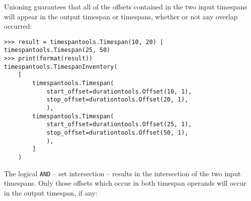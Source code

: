 \noindent Unioning guarantees that all of the offsets contained in the two
input timespans will appear in the output timespan or timespans, whether or not
any overlap occurred:

\begin{comment}
<abjad>
result = timespantools.Timespan(10, 20) | timespantools.Timespan(25, 50)
print(format(result))
</abjad>
\end{comment}

\begin{singlespacing}
\vspace{-0.5\baselineskip}
\begin{lstlisting}
>>> result = timespantools.Timespan(10, 20) | timespantools.Timespan(25, 50)
>>> print(format(result))
timespantools.TimespanInventory(
    [
        timespantools.Timespan(
            start_offset=durationtools.Offset(10, 1),
            stop_offset=durationtools.Offset(20, 1),
            ),
        timespantools.Timespan(
            start_offset=durationtools.Offset(25, 1),
            stop_offset=durationtools.Offset(50, 1),
            ),
        ]
    )
\end{lstlisting}
\end{singlespacing}

\noindent The logical \texttt{AND} -- set intersection -- results in the
intersection of the two input timespans. Only those offsets which occur in both
timespan operands will occur in the output timespan, if any:

\begin{comment}
<abjad>
result = timespantools.Timespan(0, 10) & timespantools.Timespan(5, 15)
print(format(result))
result = timespantools.Timespan(0, 10) & timespantools.Timespan(10, 20)
print(format(result))
result = timespantools.Timespan(5, 15) & timespantools.Timespan(10, 20)
print(format(result))
</abjad>
\end{comment}

